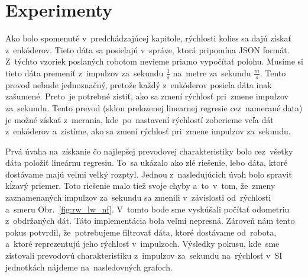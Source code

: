 \section{Experimenty}
\label{sec:experimenty}

Ako bolo spomenuté v~predchádzajúcej kapitole, rýchlosti kolies sa dajú získať z~enkóderov. Tieto dáta sa posielajú v~správe, ktorá pripomína JSON formát.
Z~týchto vzoriek poslaných robotom nevieme priamo vypočítať polohu. Musíme si tieto dáta premeniť z~impulzov za~sekundu \(\frac{1}{s}\) na~metre
za~sekundu \(\frac{m}{s}\). Tento prevod nebude jednoznačný, pretože každý z~enkóderov posiela dáta inak zašumené. Preto~je potrebné zistiť, ako sa zmení
rýchlosť pri~zmene impulzov za~sekundu. Tento prevod (sklon prelozenej linearnej regresie cez~namerané data) je možné získať z~merania, kde~po~nastavení
rýchlostí zoberieme veľa dát z~enkóderov a~zistíme, ako sa zmení rýchlosť pri~zmene impulzov za~sekundu.

Prvá úvaha na~získanie čo najlepšej prevodovej charakteristiky bolo cez~všetky dáta položiť lineárnu regresiu. To~sa ukázalo ako zlé riešenie, lebo dáta,
ktoré dostávame majú veľmi veľký rozptyl. Jednou z~nasledujúcich úvah bolo spraviť kĺzavý priemer. Toto riešenie malo tiež svoje chyby a~to~v~tom, že~zmeny
zaznamenaných impulzov za~sekundu sa zmenili v~závislosti od~rýchlosti a~smeru Obr.~\ref{fig:rw_lw_nf}. V~tomto bode sme vyskúšali počítať odometriu
z~obdržaných dát. Táto implementácia bola veľmi nepresná. Zároveň nám tento pokus potvrdil, že~potrebujeme filtrovať dáta, ktoré dostávame
od~robota, a~ktoré reprezentujú jeho rýchlosť v~impulzoch. Výsledky pokusu, kde~sme zisťovali prevodovú charakteristiku z~impulzov za~sekundu na~rýchlosť
v~SI jednotkách nájdeme na~nasledovných grafoch.

